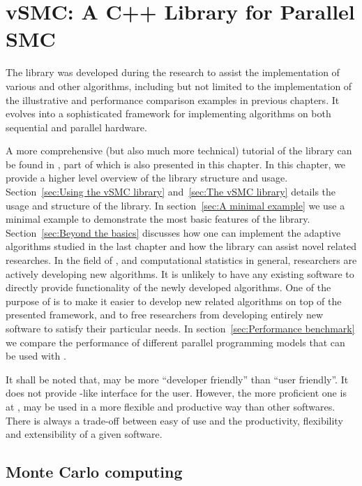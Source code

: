 \chapter{vSMC: A C++ Library for Parallel SMC}
\label{cha:vSMC: A C++ Library for Parallel SMC}

The \vsmc library \cite{software:VSMC} was developed during the research to
assist the implementation of various \smc and other algorithms, including but
not limited to the implementation of the illustrative and performance
comparison examples in previous chapters. It evolves into a sophisticated \cpp
framework for implementing \smc algorithms on both sequential and parallel
hardware.

A more comprehensive (but also much more technical) tutorial of the library
can be found in \cite{software:VSMC}, part of which is also presented in this
chapter. In this chapter, we provide a higher level overview of the library
structure and usage. Section~\ref{sec:Using the vSMC library} and~\ref{sec:The
  vSMC library} details the usage and structure of the library. In
section~\ref{sec:A minimal example} we use a minimal example to demonstrate
the most basic features of the library. Section~\ref{sec:Beyond the basics}
discusses how one can implement the adaptive algorithms studied in the last
chapter and how the library can assist novel \smc related researches. In the
field of \smc, and computational statistics in general, researchers are
actively developing new algorithms. It is unlikely to have any existing
software to directly provide functionality of the newly developed algorithms.
One of the purpose of \vsmc is to make it easier to develop new \smc related
algorithms on top of the presented framework, and to free researchers from
developing entirely new software to satisfy their particular needs. In
section~\ref{sec:Performance benchmark} we compare the performance of
different parallel programming models that can be used with \vsmc.

It shall be noted that, \vsmc may be more ``developer friendly'' than ``user
friendly''. It does not provide \bugs-like interface for the user. However,
the more proficient one is at \cpp, \vsmc may be used in a more flexible and
productive way than other softwares. There is always a trade-off between easy
of use and the productivity, flexibility and extensibility of a given
software.

\section{Monte Carlo computing}
\label{sec:Monte Carlo computing}

